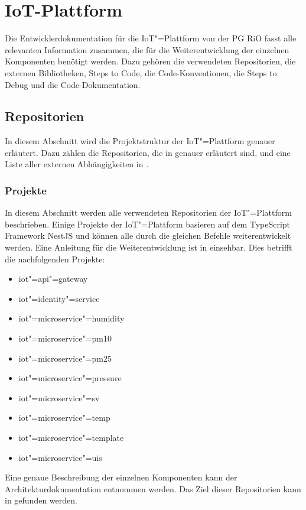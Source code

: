 \section{IoT-Plattform}
Die Entwicklerdokumentation für die IoT"=Plattform von der PG RiO fasst alle relevanten Information zusammen, die für die Weiterentwicklung der einzelnen Komponenten benötigt werden.
Dazu gehören die verwendeten Repositorien, die externen Bibliotheken, Steps to Code, die Code-Konventionen, die Steps to Debug und die Code-Dokumentation. 

\subsection{Repositorien}
In diesem Abschnitt wird die Projektstruktur der IoT"=Plattform genauer erläutert. Dazu zählen die Repositorien, die in  genauer erläutert sind, und eine Liste aller externen Abhängigkeiten in .

\subsubsection{Projekte}
\label{sec:iot:repositorien}
In diesem Abschnitt werden alle verwendeten Repositorien der IoT"=Plattform beschrieben. Einige Projekte der IoT"=Plattform basieren auf dem TypeScript Framework NestJS und können alle durch die gleichen Befehle weiterentwickelt werden. Eine Anleitung für die Weiterentwicklung ist in  einsehbar. Dies betrifft die nachfolgenden Projekte:
\begin{itemize}
	\item iot"=api"=gateway
	\item iot"=identity"=service
	\item iot"=microservice"=humidity
	\item iot"=microservice"=pm10
	\item iot"=microservice"=pm25
	\item iot"=microservice"=pressure
	\item iot"=microservice"=sv
	\item iot"=microservice"=temp
	\item iot"=microservice"=template
	\item iot"=microservice"=uis
\end{itemize}
Eine genaue Beschreibung der einzelnen Komponenten kann der Architekturdokumentation entnommen werden. 
Das Ziel dieser Repositorien kann in   gefunden werden.

